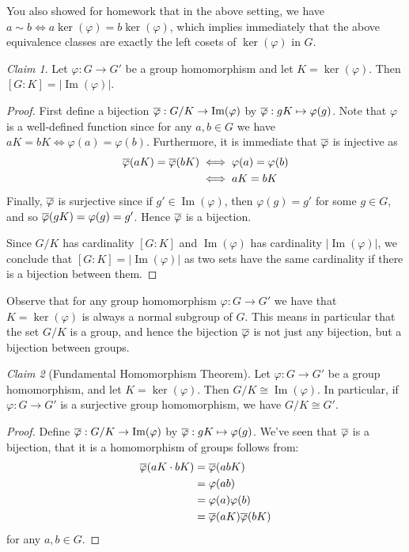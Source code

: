 \documentclass[12pt,letterpaper,DIV=11,final]{scrartcl}
\theoremstyle{plain}
\theoremstyle{definition}
\theoremstyle{remark}
\newtheorem{claim}{Claim}
\DeclareMathOperator{\ima}{Im}
\begin{document}
You also showed for homework that in the above setting, we have $a \sim b \iff a \ker(\varphi) = b \ker(\varphi)$,
which implies immediately that the above equivalence classes are exactly the left cosets of $\ker(\varphi)$ in $G$.

\begin{claim}\label{claim:grouphomomorphism_ker}
  Let $\varphi : G \to G'$ be a group homomorphism and let $K = \ker(\varphi)$.
  Then $[G : K] = |\ima(\varphi)|$.

  \begin{proof}
    First define a bijection $\varphibar : G/K \to \ima(\varphi)$ by $\overline{\varphi} : gK \mapsto \varphi(g)$.
    Note that $\varphi$ is a well-defined function since for any $a, b \in G$ we have $aK = bK \iff \varphi(a) = \varphi(b)$.
    Furthermore, it is immediate that $\overline{\varphi}$ is injective as
    \begin{align*}
      \overline{\varphi}(aK) = \overline{\varphi}(bK) &\iff \varphi(a) = \varphi(b) \\
                                      &\iff aK = bK
    \end{align*}
    Finally, $\overline{\varphi}$ is surjective since if $g' \in \ima(\varphi)$, then $\varphi(g) = g'$ for some $g \in G$, and so $\overline{\varphi}(gK) = \varphi(g) = g'$.
    Hence $\overline{\varphi}$ is a bijection.

    Since $G/K$ has cardinality $[G : K]$ and $\ima(\varphi)$ has cardinality $|\ima(\varphi)|$,
    we conclude that $[G : K] = |\ima(\varphi)|$ as two sets have the same cardinality if there is a bijection between them.
  \end{proof}
\end{claim}

Observe that for any group homomorphism $\varphi : G \to G'$ we have that $K = \ker(\varphi)$ is always a normal subgroup of $G$.
This means in particular that the set $G/K$ is a group, and hence the bijection $\overline{\varphi}$ is not just any bijection, but a bijection between groups.

\begin{claim}[Fundamental Homomorphism Theorem]\label{claim:fht}
  Let $\varphi : G \to G'$ be a group homomorphism, and let $K = \ker(\varphi)$.
  Then $G/K \cong \ima(\varphi)$.
  In particular, if $\varphi : G \to G'$ is a surjective group homomorphism, we have $G/K \cong G'$.

  \begin{proof}
    Define $\varphibar : G/K \to \ima(\varphi)$ by $\overline{\varphi} : gK \mapsto \varphi(g)$.
    We've seen that $\overline{\varphi}$ is a bijection, that it is a homomorphism of groups follows from:
    \begin{align*}
      \overline{\varphi}(aK \cdot bK) &= \overline{\varphi}(abK) \\
                              &= \varphi(ab) \\
                              &= \varphi(a) \varphi(b) \\
                              &= \overline{\varphi}(aK) \overline{\varphi}(bK)
    \end{align*}
    for any $a, b \in G$.
  \end{proof}
\end{claim}
\end{document}
